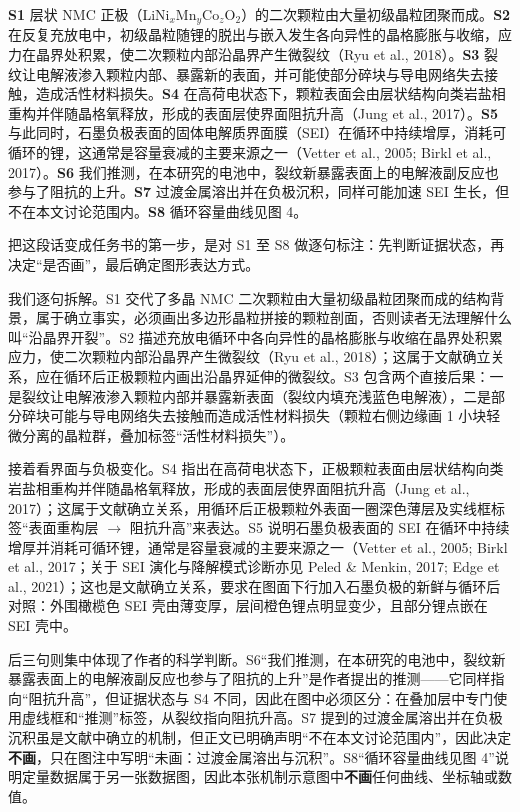 \begin{BookNote}
\textbf{S1} 层状 NMC 正极（LiNi$_x$Mn$_y$Co$_z$O$_2$）的二次颗粒由大量初级晶粒团聚而成。\textbf{S2} 在反复充放电中，初级晶粒随锂的脱出与嵌入发生各向异性的晶格膨胀与收缩，应力在晶界处积累，使二次颗粒内部沿晶界产生微裂纹（Ryu et al., 2018）。\textbf{S3} 裂纹让电解液渗入颗粒内部、暴露新的表面，并可能使部分碎块与导电网络失去接触，造成活性材料损失。\textbf{S4} 在高荷电状态下，颗粒表面会由层状结构向类岩盐相重构并伴随晶格氧释放，形成的表面层使界面阻抗升高（Jung et al., 2017）。\textbf{S5} 与此同时，石墨负极表面的固体电解质界面膜（SEI）在循环中持续增厚，消耗可循环的锂，这通常是容量衰减的主要来源之一（Vetter et al., 2005; Birkl et al., 2017）。\textbf{S6} 我们推测，在本研究的电池中，裂纹新暴露表面上的电解液副反应也参与了阻抗的上升。\textbf{S7} 过渡金属溶出并在负极沉积，同样可能加速 SEI 生长，但不在本文讨论范围内。\textbf{S8} 循环容量曲线见图 4。
\end{BookNote}

把这段话变成任务书的第一步，是对 S1 至 S8 做逐句标注：先判断证据状态，再决定“是否画”，最后确定图形表达方式。

我们逐句拆解。S1 交代了多晶 NMC 二次颗粒由大量初级晶粒团聚而成的结构背景，属于确立事实，必须画出多边形晶粒拼接的颗粒剖面，否则读者无法理解什么叫“沿晶界开裂”。S2 描述充放电循环中各向异性的晶格膨胀与收缩在晶界处积累应力，使二次颗粒内部沿晶界产生微裂纹（Ryu et al., 2018）；这属于文献确立关系，应在循环后正极颗粒内画出沿晶界延伸的微裂纹。S3 包含两个直接后果：一是裂纹让电解液渗入颗粒内部并暴露新表面（裂纹内填充浅蓝色电解液），二是部分碎块可能与导电网络失去接触而造成活性材料损失（颗粒右侧边缘画 1 小块轻微分离的晶粒群，叠加标签“活性材料损失”）。

接着看界面与负极变化。S4 指出在高荷电状态下，正极颗粒表面由层状结构向类岩盐相重构并伴随晶格氧释放，形成的表面层使界面阻抗升高（Jung et al., 2017）；这属于文献确立关系，用循环后正极颗粒外表面一圈深色薄层及实线框标签“表面重构层 \ensuremath{\rightarrow} 阻抗升高”来表达。S5 说明石墨负极表面的 SEI 在循环中持续增厚并消耗可循环锂，通常是容量衰减的主要来源之一（Vetter et al., 2005; Birkl et al., 2017；关于 SEI 演化与降解模式诊断亦见 Peled \& Menkin, 2017; Edge et al., 2021）；这也是文献确立关系，要求在图面下行加入石墨负极的新鲜与循环后对照：外围橄榄色 SEI 壳由薄变厚，层间橙色锂点明显变少，且部分锂点嵌在 SEI 壳中。

后三句则集中体现了作者的科学判断。S6“我们推测，在本研究的电池中，裂纹新暴露表面上的电解液副反应也参与了阻抗的上升”是作者提出的推测——它同样指向“阻抗升高”，但证据状态与 S4 不同，因此在图中必须区分：在叠加层中专门使用虚线框和“推测”标签，从裂纹指向阻抗升高。S7 提到的过渡金属溶出并在负极沉积虽是文献中确立的机制，但正文已明确声明“不在本文讨论范围内”，因此决定\textbf{不画}，只在图注中写明“未画：过渡金属溶出与沉积”。S8“循环容量曲线见图 4”说明定量数据属于另一张数据图，因此本张机制示意图中\textbf{不画}任何曲线、坐标轴或数值。

